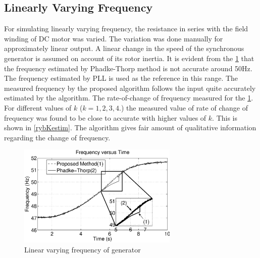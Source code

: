 \subsection{Linearly Varying Frequency}
For simulating linearly varying frequency, the resistance in series with the field winding of DC motor was varied. The variation was done manually for approximately linear output. A linear change in the speed of the synchronous generator is assumed on account of its rotor inertia. It is evident from the \figurename\ref{ryblinearfreq} that the frequency estimated by Phadke-Thorp method\cite{phadkethorp} is not accurate around 50Hz. The frequency estimated by PLL is used as the reference in this range. The measured frequency by the proposed algorithm follows the input quite accurately estimated by the algorithm.
The rate-of-change of frequency measured for the \figurename\ref{ryblinearfreq}. For different values of $k$ ($k=1,2,3,4.$) the measured value of rate of change of frequency was found to be close to accurate with higher values of $k$. This is shown in \figurename\ref{rybKestim}. The algorithm gives fair amount of qualitative information regarding the change of frequency.
\begin{figure}[!t]
 \centering
 \includegraphics[width=3.0in]{ryblinearfreq}
 \caption{Linear varying frequency of generator}
 \label{ryblinearfreq}
 \end{figure}

